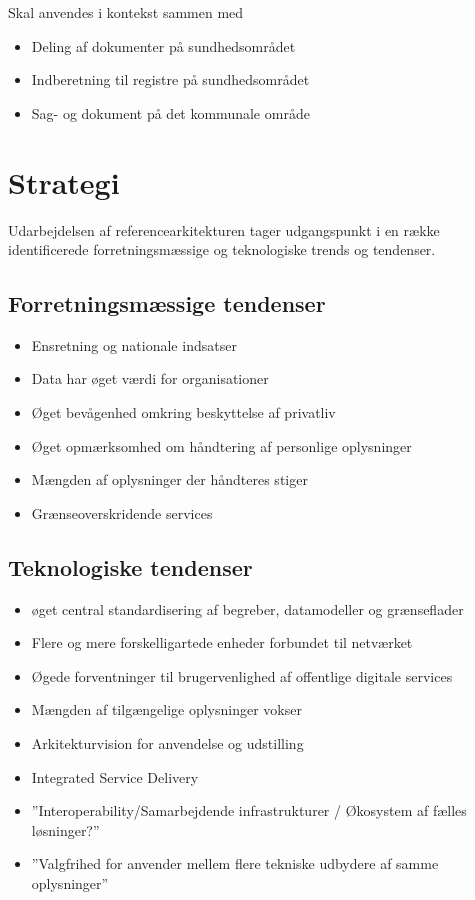 Skal anvendes i kontekst sammen med

\begin{itemize}
\tightlist
\item
  Deling af dokumenter på sundhedsområdet
\item
  Indberetning til registre på sundhedsområdet
\item
  Sag- og dokument på det kommunale område
\end{itemize}

\section{Strategi}\label{strategi}

Udarbejdelsen af referencearkitekturen tager udgangspunkt i en række
identificerede forretningsmæssige og teknologiske trends og tendenser.

\subsection{Forretningsmæssige
tendenser}\label{forretningsmuxe6ssige-tendenser}

\begin{itemize}
\tightlist
\item
  Ensretning og nationale indsatser
\item
  Data har øget værdi for organisationer
\item
  Øget bevågenhed omkring beskyttelse af privatliv
\item
  Øget opmærksomhed om håndtering af personlige oplysninger
\item
  Mængden af oplysninger der håndteres stiger
\item
  Grænseoverskridende services
\end{itemize}

\subsection{Teknologiske tendenser}\label{teknologiske-tendenser}

\begin{itemize}
\tightlist
\item
  øget central standardisering af begreber, datamodeller og grænseflader
\item
  Flere og mere forskelligartede enheder forbundet til netværket
\item
  Øgede forventninger til brugervenlighed af offentlige digitale
  services
\item
  Mængden af tilgængelige oplysninger vokser
\item
  Arkitekturvision for anvendelse og udstilling
\item
  Integrated Service Delivery
\item
  ''Interoperability/Samarbejdende infrastrukturer / Økosystem af fælles
  løsninger?''
\item
  ''Valgfrihed for anvender mellem flere tekniske udbydere af samme
  oplysninger''
\end{itemize}

